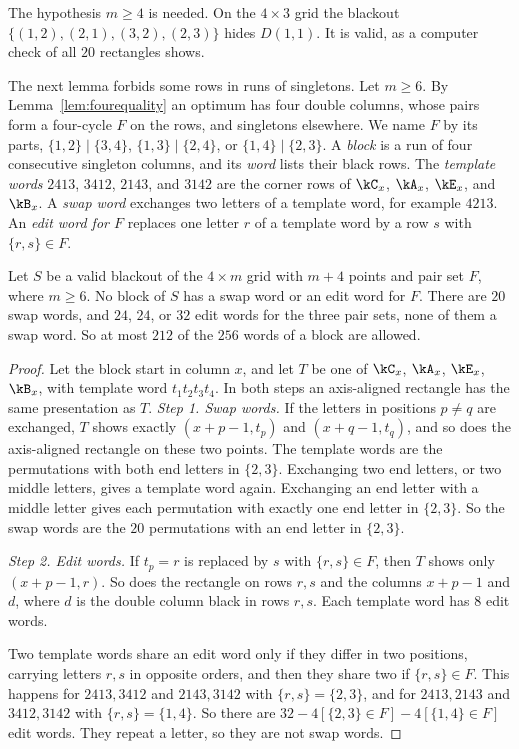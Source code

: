 The hypothesis $m\ge4$ is needed. On the $4\times3$ grid the blackout $\{(1,2),(2,1),(3,2),(2,3)\}$ hides $D(1,1)$. It is valid, as a computer check of all $20$ rectangles shows.

The next lemma forbids some rows in runs of singletons. Let $m\ge6$. By Lemma~\ref{lem:fourequality} an optimum has four double columns, whose pairs form a four-cycle $F$ on the rows, and singletons elsewhere. We name $F$ by its parts, $\{1,2\}\mid\{3,4\}$, $\{1,3\}\mid\{2,4\}$, or $\{1,4\}\mid\{2,3\}$. A \emph{block} is a run of four consecutive singleton columns, and its \emph{word} lists their black rows. The \emph{template words} $2413$, $3412$, $2143$, and $3142$ are the corner rows of $\kC_x$, $\kA_x$, $\kE_x$, and $\kB_x$. A \emph{swap word} exchanges two letters of a template word, for example $4213$. An \emph{edit word for $F$} replaces one letter $r$ of a template word by a row $s$ with $\{r,s\}\in F$.

\begin{lemma}\label{lem:blocks}
Let $S$ be a valid blackout of the $4\times m$ grid with $m+4$ points and pair set $F$, where $m\ge6$. No block of $S$ has a swap word or an edit word for $F$. There are $20$ swap words, and $24$, $24$, or $32$ edit words for the three pair sets, none of them a swap word. So at most $212$ of the $256$ words of a block are allowed.
\end{lemma}

\begin{proof}
Let the block start in column $x$, and let $T$ be one of $\kC_x$, $\kA_x$, $\kE_x$, $\kB_x$, with template word $t_1t_2t_3t_4$. In both steps an axis-aligned rectangle has the same presentation as $T$.
\emph{Step 1. Swap words.} If the letters in positions $p\ne q$ are exchanged, $T$ shows exactly $(x+p-1,t_p)$ and $(x+q-1,t_q)$, and so does the axis-aligned rectangle on these two points. The template words are the permutations with both end letters in $\{2,3\}$. Exchanging two end letters, or two middle letters, gives a template word again. Exchanging an end letter with a middle letter gives each permutation with exactly one end letter in $\{2,3\}$. So the swap words are the $20$ permutations with an end letter in $\{2,3\}$.

\emph{Step 2. Edit words.} If $t_p=r$ is replaced by $s$ with $\{r,s\}\in F$, then $T$ shows only $(x+p-1,r)$. So does the rectangle on rows $r,s$ and the columns $x+p-1$ and $d$, where $d$ is the double column black in rows $r,s$. Each template word has $8$ edit words.

Two template words share an edit word only if they differ in two positions, carrying letters $r,s$ in opposite orders, and then they share two if $\{r,s\}\in F$. This happens for $2413,3412$ and $2143,3142$ with $\{r,s\}=\{2,3\}$, and for $2413,2143$ and $3412,3142$ with $\{r,s\}=\{1,4\}$. So there are $32-4[\{2,3\}\in F]-4[\{1,4\}\in F]$ edit words. They repeat a letter, so they are not swap words.
\end{proof}

